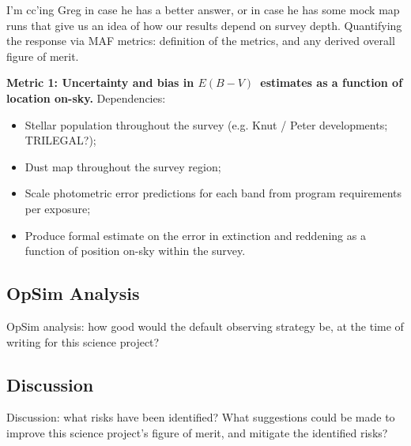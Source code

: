 I'm cc'ing Greg in case he has a better answer, or in case he has some mock map runs that give us an idea of how our results depend on survey depth. 
Quantifying the response via MAF metrics: definition of the metrics,
and any derived overall figure of merit.

{\bf Metric 1: Uncertainty and bias in $E(B-V)$~estimates as a
  function of location on-sky.} Dependencies:

\begin{itemize}
  \item Stellar population throughout the survey (e.g. Knut / Peter developments; TRILEGAL?);
    \item Dust map throughout the survey region;
    \item Scale photometric error predictions for each band from program requirements per exposure;
      \item Produce formal estimate on the error in extinction and reddening as a function of position on-sky within the survey.
\end{itemize}



\subsection{OpSim Analysis}
\label{sec:\secname:analysis}

OpSim analysis: how good would the default observing strategy be, at
the time of writing for this science project?



\subsection{Discussion}
\label{sec:\secname:discussion}

Discussion: what risks have been identified? What suggestions could be
made to improve this science project's figure of merit, and mitigate
the identified risks?



\navigationbar
